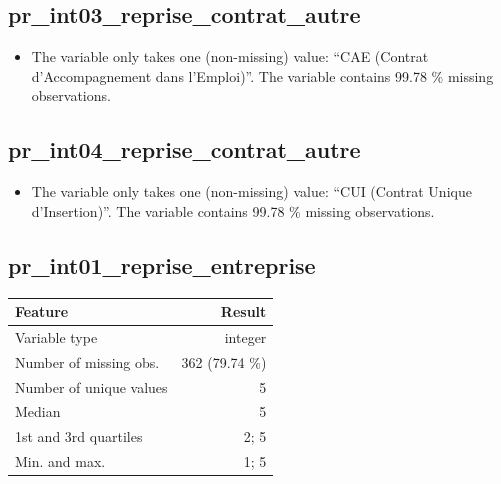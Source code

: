 \documentclass[
  letterpaper,
  DIV=11,
  numbers=noendperiod]{scrartcl}
\providecommand{\tightlist}{%
  \setlength{\itemsep}{0pt}\setlength{\parskip}{0pt}}
\begin{document}
\fullline

\subsection{pr\_int03\_reprise\_contrat\_autre}\label{pr_int03_reprise_contrat_autre}

\begin{itemize}
\tightlist
\item
  The variable only takes one (non-missing) value: ``CAE (Contrat
  d'Accompagnement dans l'Emploi)''. The variable contains 99.78 \%
  missing observations.
\end{itemize}

\fullline

\subsection{pr\_int04\_reprise\_contrat\_autre}\label{pr_int04_reprise_contrat_autre}

\begin{itemize}
\tightlist
\item
  The variable only takes one (non-missing) value: ``CUI (Contrat Unique
  d'Insertion)''. The variable contains 99.78 \% missing observations.
\end{itemize}

\fullline

\subsection{pr\_int01\_reprise\_entreprise}\label{pr_int01_reprise_entreprise}

\bminione

\begin{longtable}[]{@{}lr@{}}
\toprule\noalign{}
Feature & Result \\
\midrule\noalign{}
\endhead
\bottomrule\noalign{}
\endlastfoot
Variable type & integer \\
Number of missing obs. & 362 (79.74 \%) \\
Number of unique values & 5 \\
Median & 5 \\
1st and 3rd quartiles & 2; 5 \\
Min. and max. & 1; 5 \\
\end{longtable}

\emini
\bminitwo
\end{document}
